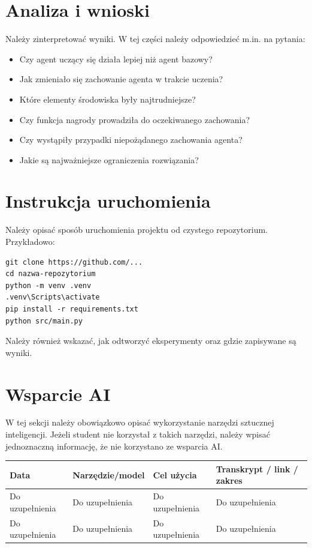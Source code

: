 \documentclass[12pt]{article}
\begin{document}
\section{Analiza i wnioski}

Należy zinterpretować wyniki. W tej części należy odpowiedzieć m.in. na pytania:
\begin{itemize}
    \item Czy agent uczący się działa lepiej niż agent bazowy?
    \item Jak zmieniało się zachowanie agenta w trakcie uczenia?
    \item Które elementy środowiska były najtrudniejsze?
    \item Czy funkcja nagrody prowadziła do oczekiwanego zachowania?
    \item Czy wystąpiły przypadki niepożądanego zachowania agenta?
    \item Jakie są najważniejsze ograniczenia rozwiązania?
\end{itemize}

\section{Instrukcja uruchomienia}

Należy opisać sposób uruchomienia projektu od czystego repozytorium. Przykładowo:

\begin{verbatim}
git clone https://github.com/...
cd nazwa-repozytorium
python -m venv .venv
.venv\Scripts\activate
pip install -r requirements.txt
python src/main.py
\end{verbatim}

Należy również wskazać, jak odtworzyć eksperymenty oraz gdzie zapisywane są wyniki.

\section{Wsparcie AI}

W tej sekcji należy obowiązkowo opisać wykorzystanie narzędzi sztucznej inteligencji. Jeżeli student nie korzystał z takich narzędzi, należy wpisać jednoznaczną informację, że nie korzystano ze wsparcia AI.

\begin{center}
\begin{tabular}{p{}p{}p{}p{}}
\toprule
Data & Narzędzie/model & Cel użycia & Transkrypt / link / zakres \\
\midrule
Do uzupełnienia & Do uzupełnienia & Do uzupełnienia & Do uzupełnienia \\
Do uzupełnienia & Do uzupełnienia & Do uzupełnienia & Do uzupełnienia \\
\bottomrule
\end{tabular}
\end{center}
\end{document}
